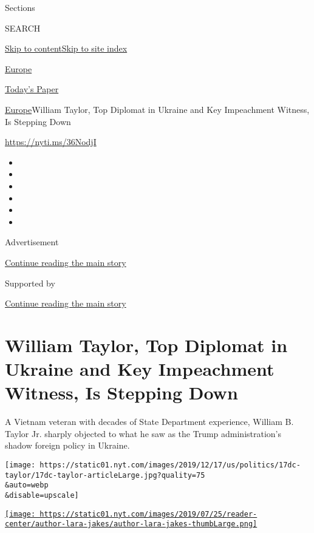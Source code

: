 Sections

SEARCH

\protect\hyperlink{site-content}{Skip to
content}\protect\hyperlink{site-index}{Skip to site index}

\href{https://www.nytimes.com/section/world/europe}{Europe}

\href{https://myaccount.nytimes.com/auth/login?response_type=cookie\&client_id=vi}{}

\href{https://www.nytimes.com/section/todayspaper}{Today's Paper}

\href{/section/world/europe}{Europe}\textbar{}William Taylor, Top
Diplomat in Ukraine and Key Impeachment Witness, Is Stepping Down

\url{https://nyti.ms/36NodjI}

\begin{itemize}
\item
\item
\item
\item
\item
\item
\end{itemize}

Advertisement

\protect\hyperlink{after-top}{Continue reading the main story}

Supported by

\protect\hyperlink{after-sponsor}{Continue reading the main story}

\hypertarget{william-taylor-top-diplomat-in-ukraine-and-key-impeachment-witness-is-stepping-down}{%
\section{William Taylor, Top Diplomat in Ukraine and Key Impeachment
Witness, Is Stepping
Down}\label{william-taylor-top-diplomat-in-ukraine-and-key-impeachment-witness-is-stepping-down}}

A Vietnam veteran with decades of State Department experience, William
B. Taylor Jr. sharply objected to what he saw as the Trump
administration's shadow foreign policy in Ukraine.

\texttt{[image: https://static01.nyt.com/images/2019/12/17/us/politics/17dc-taylor/17dc-taylor-articleLarge.jpg?quality=75\\\&auto=webp\\\&disable=upscale]}

\href{https://www.nytimes.com/by/lara-jakes}{\texttt{[image: https://static01.nyt.com/images/2019/07/25/reader-center/author-lara-jakes/author-lara-jakes-thumbLarge.png]}}

